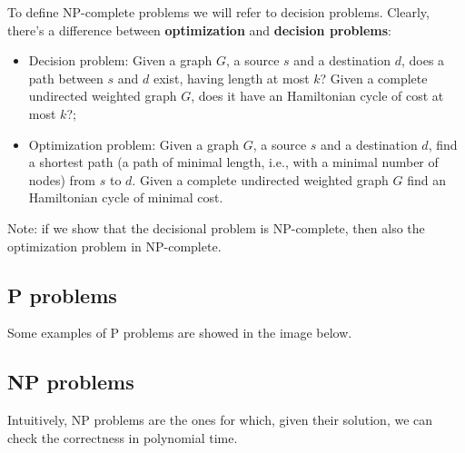 

To define NP-complete problems we will refer to decision problems. Clearly, there's a difference between \textbf{optimization} and \textbf{decision problems}:

\begin{itemize}
    \item Decision problem: Given a graph $G$, a source $s$ and a destination $d$, does a path between $s$ and $d$ exist, having length at most $k$? Given a complete undirected weighted graph $G$, does it have an Hamiltonian cycle of cost at most $k$?;
    \item Optimization problem: Given a graph $G$, a source $s$ and a destination $d$, find a shortest path (a path of minimal length, i.e., with a minimal number of nodes) from $s$ to $d$. Given a complete undirected weighted graph $G$ find an Hamiltonian cycle of minimal cost.
\end{itemize}

Note: if we show that the decisional problem is NP-complete, then also the optimization problem in NP-complete.

\subsection{P problems}


Some examples of P problems are showed in the image below.


\subsection{NP problems}


Intuitively, NP problems are the ones for which, given their solution, we can check the correctness in polynomial time.

